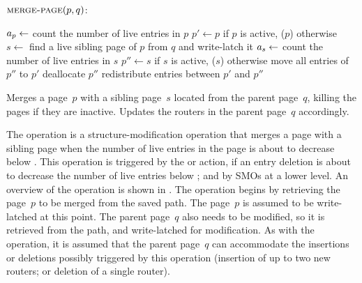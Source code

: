 \begin{algorithm}[htb]
$\proc{merge-page}(p, q)$:

\begin{algorithmic}[1]
\STATE $a_{p} \gets$ count the number of live entries in $p$
\STATE $p' \leftarrow p$ if $p$ is active, ($p$) otherwise
\STATE $s \leftarrow$ find a live sibling page of $p$ from $q$ and
write-latch it
\STATE $a_{s} \gets$ count the number of live entries in $s$
\STATE $p'' \leftarrow s$ if $s$ is active, ($s$) otherwise 
{} 
  \STATE move all entries of $p''$ to $p'$ 
  \STATE deallocate $p''$
  \STATE redistribute entries between $p'$ and $p''$
\ENDIF
\end{algorithmic}
%
{Merges a page~$p$ with a sibling page~$s$ located from the parent page~$q$,
killing the pages if they are inactive. 
Updates the routers in the parent page~$q$ accordingly.}
\label{alg:merge}
\end{algorithm}

The  operation is a structure-modification operation that
merges a page with a sibling page when the number of live entries in the
page is about to decrease below \minlive. 
This operation is triggered by the  or 
action, if an entry deletion is about to decrease the number of live entries
below \minlive; and by SMOs at a lower level.
An overview of the operation is shown in .
The operation begins by retrieving the page~$p$ to be merged from the saved
path. 
The page~$p$ is assumed to be write-latched at this point.
The parent page~$q$ also needs to be modified, so it is retrieved from
the path, and write-latched for modification. 
As with the  operation, it is assumed that the parent
page~$q$ can accommodate the insertions or deletions possibly triggered by
this operation (insertion of up to two new routers; or deletion of a
single router).

